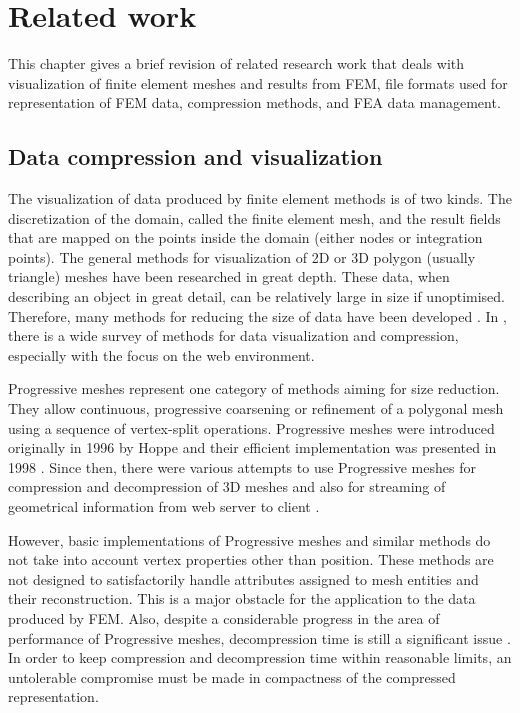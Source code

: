 \chapter{Related work}
\label{chapter:related-work}


This chapter gives a brief revision of related research work that deals with visualization of finite element meshes and results from FEM, file formats used for representation of FEM data, compression methods, and FEA data management.


\section{Data compression and visualization}

The visualization of data produced by finite element methods is of two kinds. The discretization of the domain, called the finite element mesh, and the result fields that are mapped on the points inside the domain (either nodes or integration points). The general methods for visualization of 2D or 3D polygon (usually triangle) meshes have been researched in great depth. These data, when describing an object in great detail, can be relatively large in size if unoptimised. Therefore, many methods for reducing the size of data have been developed \cite{Alliez2005}. In \cite{Evans2014}, there is a wide survey of methods for data visualization and compression, especially with the focus on the web environment.

Progressive meshes represent one category of methods aiming for size reduction. They allow continuous, progressive coarsening or refinement of a polygonal mesh using a sequence of vertex-split operations. Progressive meshes were introduced originally in 1996 by Hoppe \cite{Hoppe1996} and their efficient implementation was presented in 1998 \cite{Hoppe1998}. Since then, there were various attempts to use Progressive meshes for compression and decompression of 3D meshes \cite{Gudukbay2002, Valette2004, Valette2009, Lavoue2013} and also for streaming of geometrical information from web server to client \cite{Alliez2001, Maglo2012}.

However, basic implementations of Progressive meshes and similar methods do not take into account vertex properties other than position. These methods are not designed to satisfactorily handle attributes assigned to mesh entities and their reconstruction. This is a major obstacle for the application to the data produced by FEM. Also, despite a considerable progress in the area of performance of Progressive meshes, decompression time is still a significant issue \cite{Limper2013}. In order to keep compression and decompression time within reasonable limits, an untolerable compromise must be made in compactness of the compressed representation.

